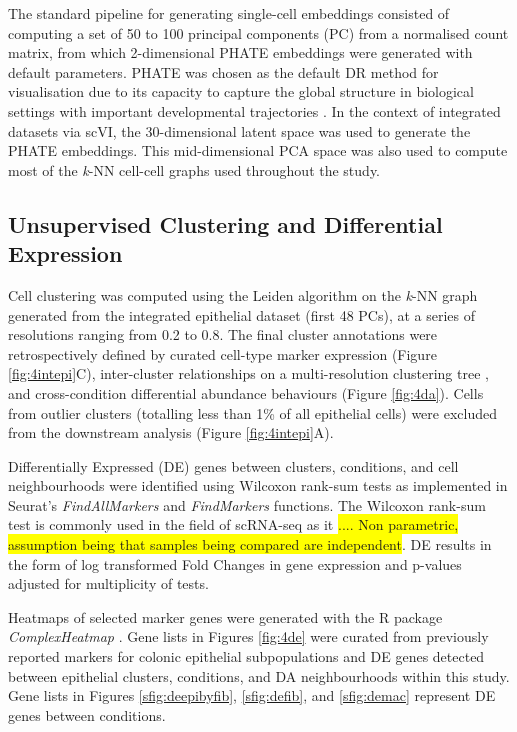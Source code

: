 The standard pipeline for generating single-cell embeddings consisted of computing a set of 50 to 100 principal components (PC) from a normalised count matrix, from which 2-dimensional PHATE embeddings were generated with default parameters. PHATE was chosen as the default DR method for visualisation due to its capacity to capture the global structure in biological settings with important developmental trajectories \cite{moon_visualizing_2019}. In the context of integrated datasets via scVI, the 30-dimensional latent space was used to generate the PHATE embeddings. 
This mid-dimensional PCA space was also used to compute most of the \emph{k}-NN cell-cell graphs used throughout the study. 


\subsection{Unsupervised Clustering and Differential Expression}

Cell clustering was computed using the Leiden algorithm on the \emph{k}-NN graph generated from the integrated epithelial dataset (first 48 PCs), at a series of resolutions ranging from 0.2 to 0.8. The final cluster annotations were retrospectively defined by curated cell-type marker expression (Figure \ref{fig:4intepi}C), inter-cluster relationships on a multi-resolution clustering tree \cite{zappia_clustering_2018}, and cross-condition differential abundance behaviours (Figure \ref{fig:4da}). Cells from outlier clusters (totalling less than 1\% of all epithelial cells) were excluded from the downstream analysis (Figure \ref{fig:4intepi}A).

Differentially Expressed (DE) genes between clusters, conditions, and cell neighbourhoods were identified using Wilcoxon rank-sum tests as implemented in Seurat's \textit{FindAllMarkers} and \textit{FindMarkers} functions. The Wilcoxon rank-sum test is commonly used in the field of scRNA-seq as it \colorbox{yellow}{.... Non parametric, assumption being that samples being compared are independent}. DE results in the form of log transformed Fold Changes in gene expression and p-values adjusted for multiplicity of tests.

Heatmaps of selected marker genes were generated with the R package \textit{ComplexHeatmap} \cite{gu_complex_2016}. Gene lists in Figures \ref{fig:4de} were curated from previously reported markers for colonic epithelial subpopulations and DE genes detected between epithelial clusters, conditions, and DA neighbourhoods within this study. Gene lists in Figures \ref{sfig:deepibyfib}, \ref{sfig:defib}, and \ref{sfig:demac} represent DE genes between conditions.

